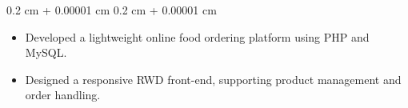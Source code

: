 \documentclass[10pt, letterpaper]{article}
\newenvironment{highlights}{
    \begin{itemize}[
        topsep=0.10 cm,
        parsep=0.10 cm,
        partopsep=0pt,
        itemsep=0pt,
        leftmargin=0.4 cm + 10pt
    ]
}{
    \end{itemize}
} %
\newenvironment{onecolentry}{
    \begin{adjustwidth}{
        0.2 cm + 0.00001 cm
    }{
        0.2 cm + 0.00001 cm
    }
}{
    \end{adjustwidth}
} %
\begin{document}
        \vspace{0.10 cm}
        \begin{onecolentry}
            \begin{highlights}
                
                \item Developed a lightweight online food ordering platform using PHP and MySQL.
                \item Designed a responsive RWD front-end, supporting product management and order handling.
            \end{highlights}
        \end{onecolentry}


            

            
    
    
            

    

      
   


    
\end{document}
